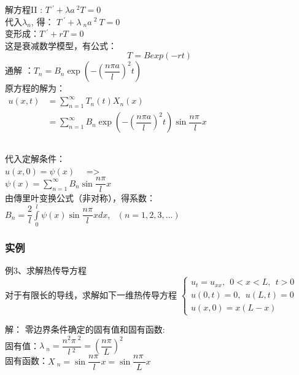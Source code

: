 \begin{frame}
	\frametitle{}	
	解方程II : 	$\displaystyle  T~^{'} +\lambda {a~^2 T}=0 $ \\ 
	代入$\lambda_n$, 得：
	$\displaystyle  T~^{'} +\lambda~_n a~^2 ~T=0 $ \\
	变形成：$\displaystyle  T~^{'} + rT=0 $ \\ \vspace{0.6em}
	这是衰减数学模型，有公式：
	\begin{equation*}
		T= Bexp(-rt)
	\end{equation*}
	通解 ：$\displaystyle T_n=B_n  \exp(-(\dfrac{n\pi a}{l})^2 t)$ \\  
	原方程的解为：\\ \vspace{0.3cm}
	$\begin{array}{llll}
		u(x,t) &= \sum\limits_{n=1}^{\infty }T_n(t)X_n(x)\\
		&= \sum\limits_{n=1}^{\infty }B_n  \exp(-(\dfrac{n\pi a}{l})^2 t) \sin \dfrac{n\pi~}{l} x \\
	\end{array}$ \\ 
\end{frame}	

\begin{frame}
	\frametitle{}	
	代入定解条件：\\ 
	$ \displaystyle u(x,0)= \psi(x)$ ~~=> \\
	$\psi (x)=\sum\limits_{n=1}^{\infty } B_n \sin \dfrac{ n\pi }{l} x$\\  
	由傳里叶变换公式（非对称），得系数：\\  
	$ \displaystyle B_n=  \dfrac{2}{l}\int\limits_{0 }^{l}  \psi (x) \sin \dfrac{ n\pi }{l} x dx , ~~~ (n=1,2,3,...) $\\   
\end{frame}	

\begin{frame}
	\frametitle{实例}
	\begin{exampleblock} {例3、求解热传导方程}
		~\\
	对于有限长的导线，求解如下一维热传导方程 
	$\displaystyle \begin{cases}
		u_{t} =u_{xx} ,~~ 0<x<L, ~~t>0\\
		u(0,t) =0, ~~u(L,t)=0 \\
		u(x,0) =x(L-x)
	\end{cases}$ \\
	\end{exampleblock}
	\alert{解：} 
	零边界条件确定的固有值和固有函数:\\
	固有值：$\displaystyle  \lambda~_n=\dfrac{n^2\pi~^2}{l~^2 }= (\dfrac{n\pi }{L}) ^2$ \\ 
	固有函数：$\displaystyle  X~_n=\sin \dfrac{n\pi~}{l} x=\sin \dfrac{n\pi~}{L} x $\\	
\end{frame}	

